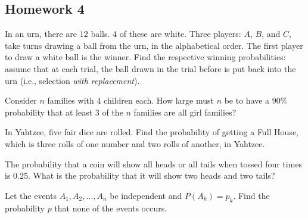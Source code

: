 \subsection{Homework 4}
\begin{problem}[Handout 5, \# 2]
  In an urn, there are \(12\) balls. \(4\) of these are white. Three
  players: \(A\), \(B\), and \(C\), take turns drawing a ball from the urn,
  in the alphabetical order. The first player to draw a white ball is the
  winner. Find the respective winning probabilities: assume that at each
  trial, the ball drawn in the trial before is put back into the urn (i.e.,
  selection \emph{with replacement}).
\end{problem}
\begin{solution*}
\end{solution*}

\begin{problem}[Handout 5, \# 8]
  Consider \(n\) families with \(4\) children each. How large must \(n\) be
  to have a \(90\%\) probability that at least \(3\) of the \(n\) families
  are all girl families?
\end{problem}
\begin{solution*}
\end{solution*}

\begin{problem}
  In Yahtzee, five fair dice are rolled. Find the probability of getting a
  Full House, which is three rolls of one number and two rolls of another,
  in Yahtzee.
\end{problem}
\begin{solution*}
\end{solution*}

\begin{problem}[Handout 5, \# 12]
  The probability that a coin will show all heads or all tails when tossed
  four times is \(0.25\). What is the probability that it will show two
  heads and two tails?
\end{problem}
\begin{solution*}
\end{solution*}

\begin{problem}[Handout 5, \# 13]
  Let the events \(A_1, A_2,\dotsc,A_n\) be independent and
  \(P(A_k)=p_k\). Find the probability \(p\) that none of the events
  occurs.
\end{problem}
\begin{solution*}
\end{solution*}

